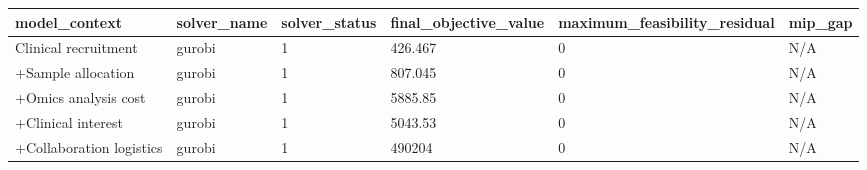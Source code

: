 \begin{tabular}{llllll}
\hline
model\_context & solver\_name & solver\_status & final\_objective\_value & maximum\_feasibility\_residual & mip\_gap \\
\hline
Clinical recruitment & gurobi & 1 & 426.467 & 0 & N/A \\
+Sample allocation & gurobi & 1 & 807.045 & 0 & N/A \\
+Omics analysis cost & gurobi & 1 & 5885.85 & 0 & N/A \\
+Clinical interest & gurobi & 1 & 5043.53 & 0 & N/A \\
+Collaboration logistics & gurobi & 1 & 490204 & 0 & N/A \\
\hline
\end{tabular}
